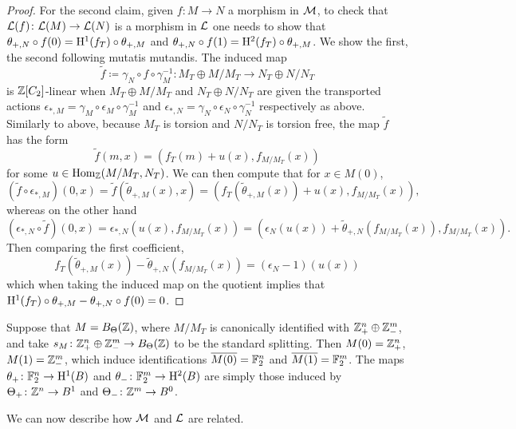 \begin{proof}
  For the second claim, given $f \colon M \rightarrow N$ a morphism in ${\mathcal M}$, to check that ${\mathcal L}(f) \colon {\mathcal L}(M) \rightarrow {\mathcal L}(N)$ is a morphism in ${\mathcal L}$ one needs to show that $\theta_{+,N} \circ f(0) = \mathrm{H}^1(f_T) \circ \theta_{+,M}$ and $\theta_{+,N} \circ f(1) = \mathrm{H}^2(f_T) \circ \theta_{+,M}$. We show the first, the second following mutatis mutandis. The induced map
  \[
  \widetilde{f} \coloneqq \gamma_N \circ f \circ \gamma_M^{-1} \colon M_T \oplus M/M_T \rightarrow N_T \oplus N / N_T
  \]
  is ${\mathbb Z}[C_2]$-linear when $M_T \oplus M/M_T$ and $N_T \oplus N / N_T$ are given the transported actions $\epsilon_{*,M} = \gamma_M \circ \epsilon_M \circ \gamma_M^{-1}$ and $\epsilon_{*,N} = \gamma_N \circ \epsilon_N \circ \gamma_N^{-1}$ respectively as above. Similarly to above, because $M_T$ is torsion and $N / N_T$ is torsion free, the map $\widetilde{f}$ has the form
  \[
  \widetilde{f}(m,x) = (f_T(m) + u(x), f_{M/M_T}(x))
  \]
  for some $u \in \operatorname{Hom}_{{\mathbb Z}}(M/M_T, N_T)$. We can then compute that for $x \in M(0)$,
  \[
    (\widetilde{f} \circ \epsilon_{*,M})(0,x) = \widetilde{f}(\widetilde{\theta}_{+, M}(x),x) = (f_T(\widetilde{\theta}_{+, M}(x)) + u(x), f_{M/M_T}(x)),
  \]
  whereas on the other hand
  \[
  (\epsilon_{*,N} \circ \widetilde{f})(0,x) = \epsilon_{*,N}(u(x), f_{M/M_T}(x)) = (\epsilon_N(u(x)) + \widetilde{\theta}_{+,N}(f_{M/M_T}(x)), f_{M/M_T}(x)).
  \]
  Then comparing the first coefficient,
  \[
  f_T(\widetilde{\theta}_{+, M}(x)) - \widetilde{\theta}_{+,N}(f_{M/M_T}(x))  = (\epsilon_N - 1)(u(x))
  \]
  which when taking the induced map on the quotient implies that $\mathrm{H}^1(f_T) \circ \theta_{+,M} - \theta_{+,N} \circ f(0) = 0$.
\end{proof}

\begin{eg}\label{eg:stdexample}
Suppose that $M = B_{\Theta}({\mathbb Z})$, where $M / M_T$ is canonically identified with ${\mathbb Z}_+^n \oplus {\mathbb Z}_-^m$, and take $s_M \colon {\mathbb Z}_+^n \oplus {\mathbb Z}_-^m \rightarrow B_{\Theta}({\mathbb Z})$ to be the standard splitting. Then $M(0) = {\mathbb Z}_+^n$, $M(1) = {\mathbb Z}_-^m$, which induce identifications $\overline{M(0)} = {\mathbb F}_2^n$ and $\overline{M(1)} = {\mathbb F}_2^m$. The maps $\theta_+ \colon {\mathbb F}_2^n \rightarrow \mathrm{H}^1(B)$ and $\theta_- \colon {\mathbb F}_2^m \rightarrow \mathrm{H}^2(B)$ are simply those induced by $\Theta_+ \colon {\mathbb Z}^n \rightarrow B^1$ and $\Theta_- \colon {\mathbb Z}^m \rightarrow B^0$.
\end{eg}

We can now describe how ${\mathcal M}$ and ${\mathcal L}$ are related.

